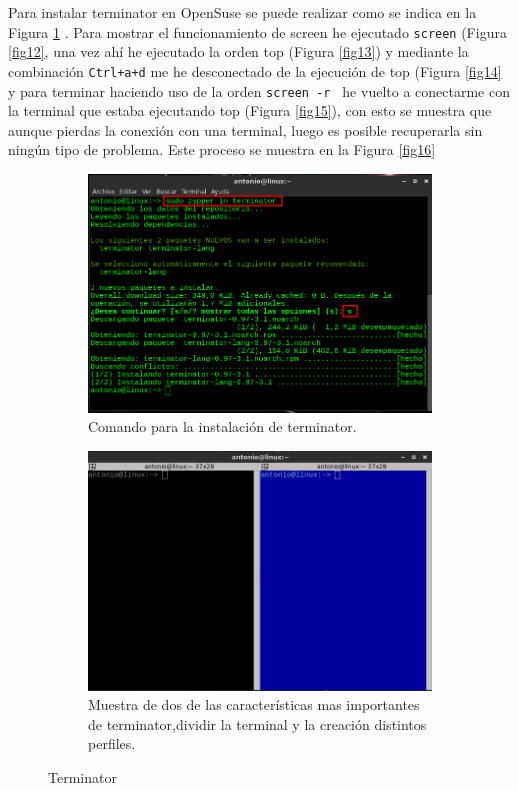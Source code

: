 Para instalar terminator en OpenSuse se puede realizar como se indica en la Figura \ref{fig10} . Para mostrar el funcionamiento de screen he ejecutado \texttt{screen} (Figura \ref{fig12}, una vez ahí he ejecutado la orden top (Figura \ref{fig13}) y mediante la combinación \texttt{Ctrl+a+d} me he desconectado de la ejecución de top (Figura \ref{fig14} y para terminar haciendo uso de la orden \texttt{screen -r } he vuelto a conectarme con la terminal que estaba ejecutando top (Figura \ref{fig15}), con esto se muestra que aunque pierdas la conexión con una terminal, luego es posible recuperarla sin ningún tipo de problema. Este proceso se muestra en la Figura \ref{fig16}


\begin{figure}[H]
    \centering
    \begin{subfigure}[b]{0.55\textwidth}
        \includegraphics[width=\textwidth]{imagenes/img11}
        \caption{Comando para la instalación de terminator.}
        \label{fig10}
    \end{subfigure}
    \begin{subfigure}[b]{0.4\textwidth}
        \includegraphics[width=\textwidth]{imagenes/img10}
        \caption{Muestra de dos de las características mas importantes de terminator,dividir la terminal y la creación distintos perfiles.}
        \label{fig11}
    \end{subfigure}
    \caption{Terminator}
\end{figure}




